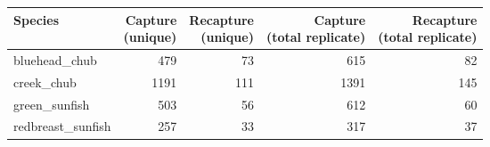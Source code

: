 \documentclass[border=1mm]{standalone}
\begin{document}
\begin{table}[!h]
\centering
\begin{tabular}[t]{lrrrr}
\toprule
Species & \makecell[c]{Capture\\(unique)} & \makecell[c]{Recapture\\(unique)} & \makecell[c]{Capture\\(total replicate)} & \makecell[c]{Recapture\\(total replicate)}\\
\midrule
bluehead_chub & 479 & 73 & 615 & 82\\
creek_chub & 1191 & 111 & 1391 & 145\\
green_sunfish & 503 & 56 & 612 & 60\\
redbreast_sunfish & 257 & 33 & 317 & 37\\
\bottomrule
\end{tabular}
\end{table}
\end{document}
